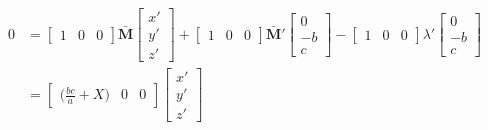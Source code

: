 \documentclass[preprint,12pt]{elsarticle}
\newcommand{\M}{\mathbf{M}}
\begin{document}
\begin{align}\label{pre_equation_x'}
    0&= \begin{bmatrix}
        1 & 0 & 0
        \end{bmatrix}\bar{\M}  \begin{bmatrix}
                    x'\\
                    y'\\
                    z'
                \end{bmatrix}+  \begin{bmatrix}
                                    1 & 0 & 0
                                \end{bmatrix}\bar{\M}'   \begin{bmatrix}
                                                            0\\
                                                            -b\\
                                                            c
                                                        \end{bmatrix}-  \begin{bmatrix}
                                                                            1 & 0 & 0
                                                                        \end{bmatrix}\lambda'   \begin{bmatrix}
                                                                                                    0\\
                                                                                                    -b\\
                                                                                                    c
                                                                                                \end{bmatrix}\nonumber\\
    &=  \begin{bmatrix}
            \Big(\frac{bc}{a}+X\Big) & 0 & 0
        \end{bmatrix}   \begin{bmatrix}
                            x'\\
                            y'\\
                            z'
                        \end{bmatrix}\nonumber\\

\end{align}
\end{document}
